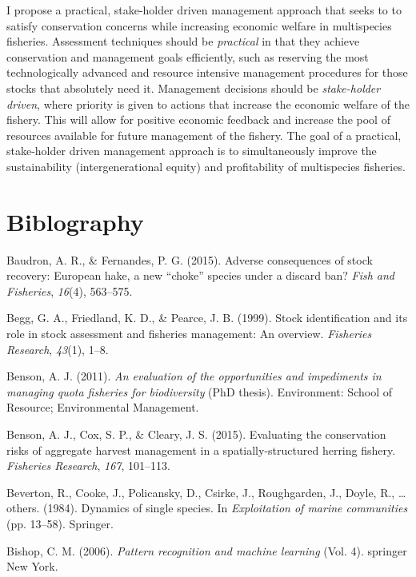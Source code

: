 \documentclass[12pt,]{scrartcl}
\begin{document}
I propose a practical, stake-holder driven management approach that
seeks to to satisfy conservation concerns while increasing economic
welfare in multispecies fisheries. Assessment techniques should be
\emph{practical} in that they achieve conservation and management goals
efficiently, such as reserving the most technologically advanced and
resource intensive management procedures for those stocks that
absolutely need it. Management decisions should be \emph{stake-holder
driven}, where priority is given to actions that increase the economic
welfare of the fishery. This will allow for positive economic feedback
and increase the pool of resources available for future management of
the fishery. The goal of a practical, stake-holder driven management
approach is to simultaneously improve the sustainability
(intergenerational equity) and profitability of multispecies fisheries.

\section{Biblography}\label{biblography}

\hypertarget{refs}{}
\hypertarget{ref-baudron2015adverse}{}
Baudron, A. R., \& Fernandes, P. G. (2015). Adverse consequences of
stock recovery: European hake, a new ``choke'' species under a discard
ban? \emph{Fish and Fisheries}, \emph{16}(4), 563--575.

\hypertarget{ref-begg1999stock}{}
Begg, G. A., Friedland, K. D., \& Pearce, J. B. (1999). Stock
identification and its role in stock assessment and fisheries
management: An overview. \emph{Fisheries Research}, \emph{43}(1), 1--8.

\hypertarget{ref-benson2011evaluation}{}
Benson, A. J. (2011). \emph{An evaluation of the opportunities and
impediments in managing quota fisheries for biodiversity} (PhD thesis).
Environment: School of Resource; Environmental Management.

\hypertarget{ref-benson2015evaluating}{}
Benson, A. J., Cox, S. P., \& Cleary, J. S. (2015). Evaluating the
conservation risks of aggregate harvest management in a
spatially-structured herring fishery. \emph{Fisheries Research},
\emph{167}, 101--113.

\hypertarget{ref-beverton1984dynamics}{}
Beverton, R., Cooke, J., Policansky, D., Csirke, J., Roughgarden, J.,
Doyle, R., \ldots{} others. (1984). Dynamics of single species. In
\emph{Exploitation of marine communities} (pp. 13--58). Springer.

\hypertarget{ref-bishop2006pattern}{}
Bishop, C. M. (2006). \emph{Pattern recognition and machine learning}
(Vol. 4). springer New York.
\end{document}
